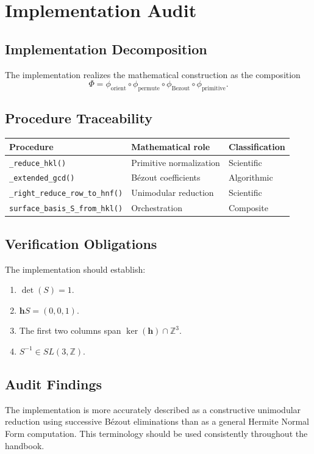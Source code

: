 
\section{Implementation Audit}

\subsection{Implementation Decomposition}

The implementation realizes the mathematical construction as the composition
\[
\Phi=\phi_{\mathrm{orient}}\circ
\phi_{\mathrm{permute}}\circ
\phi_{\mathrm{Bezout}}\circ
\phi_{\mathrm{primitive}}.
\]

\subsection{Procedure Traceability}

\begin{center}
\begin{tabular}{lll}
\hline
Procedure & Mathematical role & Classification\\
\hline
\texttt{\_reduce\_hkl()} & Primitive normalization & Scientific\\
\texttt{\_extended\_gcd()} & Bézout coefficients & Algorithmic\\
\texttt{\_right\_reduce\_row\_to\_hnf()} & Unimodular reduction & Scientific\\
\texttt{surface\_basis\_S\_from\_hkl()} & Orchestration & Composite\\
\hline
\end{tabular}
\end{center}

\subsection{Verification Obligations}

The implementation should establish:

\begin{enumerate}
\item $\det(S)=1$.
\item $\mathbf hS=(0,0,1)$.
\item The first two columns span $\ker(\mathbf h)\cap\mathbb Z^3$.
\item $S^{-1}\in SL(3,\mathbb Z)$.
\end{enumerate}

\subsection{Audit Findings}

The implementation is more accurately described as a constructive
unimodular reduction using successive Bézout eliminations than as a
general Hermite Normal Form computation. This terminology should be
used consistently throughout the handbook.
